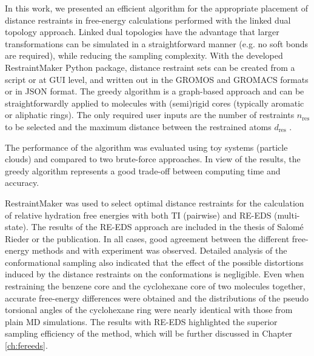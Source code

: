 In this work, we presented an efficient algorithm for the appropriate placement of distance restraints in free-energy calculations performed with the linked dual topology approach. Linked dual topologies have the advantage that larger transformations can be simulated in a straightforward manner (e.g. no soft bonds are required), while reducing the sampling complexity. 
With the developed RestraintMaker Python package, distance restraint sets can be created from a script or at GUI level, and written out in the GROMOS and GROMACS formats or in JSON format.
The greedy algorithm is a graph-based approach and can be straightforwardly applied to molecules with (semi)rigid cores (typically aromatic or aliphatic rings). The only required user inputs are the number of restraints $n_\text{res}$ to be selected and the maximum distance between the restrained atoms $d_\text{res}$ .

The performance of the algorithm was evaluated using toy systems (particle clouds) and compared to two brute-force approaches. In view of the results, the greedy algorithm represents a good trade-off between computing time and accuracy.

RestraintMaker was used to select optimal distance restraints for the calculation of relative hydration free energies with both TI (pairwise) and RE-EDS (multi-state). The results of the RE-EDS approach are included in the thesis of Salom\'e Rieder or the publication. In all cases, good agreement between the different free-energy methods and with experiment was observed. Detailed analysis of the conformational sampling also indicated that the effect of the possible distortions induced by the distance restraints on the conformations is negligible. Even when restraining the benzene core and the cyclohexane core of two molecules together, accurate free-energy differences were obtained and the distributions of the pseudo torsional angles of the cyclohexane ring were nearly identical with those from plain MD simulations.
The results with RE-EDS highlighted the superior sampling efficiency of the method, which will be further discussed in Chapter \ref{ch:fereeds}.